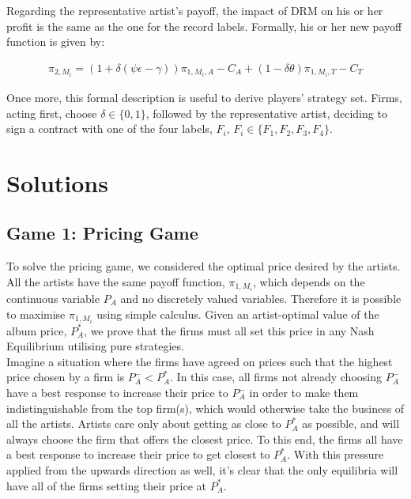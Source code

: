 \documentclass[a4paper,12pt]{article}
\numberwithin{equation}{section}
\newcommand{\artistpayoff}[2]{\pi_{#1, M_{#2}}}
\newcommand{\artistalbum}[2]{\pi_{#1, M_{#2}, A}}
\newcommand{\artistticket}[2]{\pi_{#1, M_{#2}, T}}
\newcommand{\drminf}{(\psi \epsilon - \gamma)}
\begin{document}
Regarding the representative artist’s payoff, the impact of DRM on his or her profit is the same as the one for the record labels. Formally, his or her new payoff function is given by:

\begin{eqnarray}
\artistpayoff{2}{i} = (1 + \delta \drminf) \artistalbum{1}{i} - C_A +
						(1 - \delta \theta) \artistticket{1}{i} - C_T
\end{eqnarray}

Once more, this formal description is useful to derive players’ strategy set. Firms, acting first, choose $\delta \in \{0, 1\}$, followed by the representative artist, deciding to sign a contract with one of the four labels, $F_i$, $F_i \in \{F_1, F_2, F_3, F_4\}$.

\pagebreak
\section{Solutions}

\subsection{Game 1: Pricing Game}

To solve the pricing game, we considered the optimal price desired by the artists. All the artists have the same payoff function, $\artistpayoff{1}{i}$, which depends on the continuous variable $P_A$ and no discretely valued variables. Therefore it is possible to maximise $\artistpayoff{1}{i}$ using simple calculus. Given an artist-optimal value of the album price, $P_A^*$, we prove that the firms must all set this price in any Nash Equilibrium utilising pure strategies.\\

Imagine a situation where the firms have agreed on prices such that the highest price chosen by a firm is $P_A^- < P_A^*$. In this case, all firms not already choosing $P_A^-$ have a best response to increase their price to $P_A^-$ in order to make them indistinguishable from the top firm(s), which would otherwise take the business of all the artists. Artists care only about getting as close to $P_A^*$ as possible, and will always choose the firm that offers the closest price. To this end, the firms all have a best response to increase their price to get closest to $P_A^*$. With this pressure applied from the upwards direction as well, it's clear that the only equilibria will have all of the firms setting their price at $P_A^*$.\\
\end{document}
